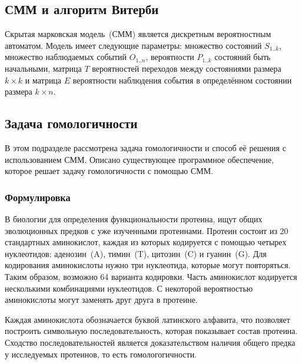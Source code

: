 \subsection{СММ и алгоритм Витерби}
Скрытая марковская модель~(СММ) является дискретным вероятностным автоматом.
Модель имеет следующие параметры: множество состояний $S_{1..k}$, множество 
наблюдаемых событий $O_{1..n}$, вероятности $P_{1..k}$ состояний быть
начальными, матрица $T$ вероятностей переходов между состояниями размера $k
\times k$ и матрица $E$ вероятности наблюдения события в определённом состоянии 
размера ${k\times n}$.

\subsection{Задача гомологичности}
В этом подразделе рассмотрена задача гомологичности и способ её решения с 
использованием СММ.
Описано существующее программное обеспечение, которое решает задачу
гомологичности с помощью СММ.

\subsubsection{Формулировка}
В биологии для определения функциональности протеина, ищут общих эволюционных
предков с уже изученными протеинами.
Протеин состоит из 20 стандартных аминокислот, каждая из которых кодируется 
с помощью четырех нуклеотидов: аденозин~(A), тимин~(T), цитозин~(C) и 
гуанин~(G).
Для кодирования аминокислоты нужно три нуклеотида, которые могут повторяться.
Таким образом, возможно 64 варианта кодировки.
Часть аминокислот кодируется несколькими комбинациями нуклеотидов.
С некоторой вероятностью аминокислоты могут заменять друг друга в протеине.

Каждая аминокислота обозначается буквой латинского алфавита, что позволяет 
построить символьную последовательность, которая показывает состав протеина.
Сходство последовательностей является доказательством наличия общего предка у 
исследуемых протеинов, то есть гомологогичности.

